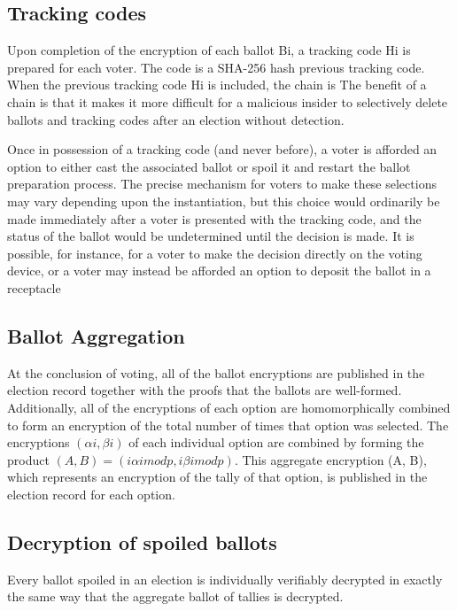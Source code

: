 \subsection{Tracking codes}
Upon completion of the encryption of each ballot Bi, a tracking code Hi is prepared for each voter. The code is a
SHA-256 hash
\cite[17]{eg-spec}
previous tracking code. When the previous tracking code Hi is included, the chain is
The benefit of a chain is that it makes it more difficult for a malicious insider to selectively delete ballots and
tracking codes after an election without detection.
\cite[17]{eg-spec}

Once in possession of a tracking code (and never before), a voter is afforded an option to either cast the associated
ballot or spoil it and restart the ballot preparation process. The precise mechanism for voters to make these selections
may vary depending upon the instantiation, but this choice would ordinarily be made immediately after a voter is
presented with the tracking code, and the status of the ballot would be undetermined until the decision is made. It is
possible, for instance, for a voter to make the decision directly on the voting device, or a voter may instead be
afforded an option to deposit the ballot in a receptacle
\cite[17]{eg-spec}

\subsection{Ballot Aggregation}
At the conclusion of voting, all of the ballot encryptions are published in the election record together with the proofs
that the ballots are well-formed. Additionally, all of the encryptions of each option are homomorphically combined to
form an encryption of the total number of times that option was selected. The encryptions $(\alpha i, \beta i)$ of each individual
option are combined by forming the product $(A, B) = ( i \alpha i mod p,  i \beta i mod p)$. This aggregate encryption (A, B),
which represents an encryption of the tally of that option, is published in the election record for each option.
\cite[18]{eg-spec}



\subsection{Decryption of spoiled ballots}
Every ballot spoiled in an election is individually verifiably decrypted in exactly the same way that the aggregate
ballot of tallies is decrypted.
\cite[21]{eg-spec}

